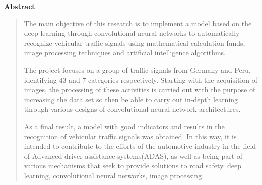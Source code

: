   \newpage
  \begin{center}
   {\bf\LARGE Abstract}\vskip 1.5cm
  \end{center} 
  \begin{quotation}

  The main objective of this research is to implement a model based on the deep learning through convolutional neural networks to automatically recognize vehicular traffic signals using mathematical calculation funds, image processing techniques and artificial intelligence algorithms.
  \vskip 0.2cm
  
  The project focuses on a group of traffic signals from Germany and Peru, identifying 43 and 7 categories respectively. Starting with the acquisition of images, the processing of these activities is carried out with the purpose of increasing the data set so then be able to carry out in-depth learning through various designs of convolutional neural network architectures.
  \vskip 0.2cm

  As a final result, a model with good indicators and results in the recognition of vehicular traffic signals was obtained. In this way, it is intended to contribute to the efforts of the automotive industry in the field of Advanced driver-assistance systems(ADAS), as well as being part of various mechanisms that seek to provide solutions to road safety.
  \vskip 0.3cm
  \hspace*{-0.6cm}{\bf Keywords:} deep learning, convolutional neural networks, image processing.
  \end {quotation}



